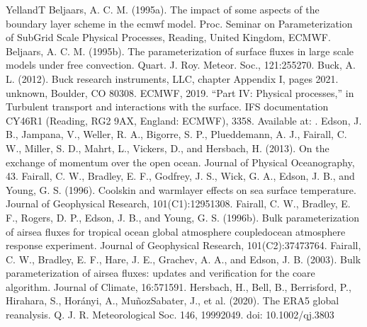 \documentclass[letterpaper,10pt,english]{sphinxmanual}
\begin{document}
\begin{sphinxthebibliography}{YellandT}
\sphinxAtStartPar
Beljaars, A. C. M. (1995a). The impact of some aspects of the boundary layer scheme in the ecmwf model. Proc. Seminar on Parameterization of Sub\sphinxhyphen{}Grid Scale Physical Processes, Reading, United Kingdom, ECMWF.
\sphinxAtStartPar
Beljaars, A. C. M. (1995b). The parameterization of surface fluxes in large scale models under free convection. Quart. J. Roy. Meteor. Soc., 121:255\textendash{}270.
\sphinxAtStartPar
Buck, A. L. (2012). Buck research instruments, LLC, chapter Appendix I, pages 20\textendash{}21. unknown, Boulder, CO 80308.
\sphinxAtStartPar
ECMWF, 2019. “Part IV: Physical processes,” in Turbulent transport and interactions with the surface. IFS documentation CY46R1 (Reading, RG2 9AX, England: ECMWF), 33\textendash{}58. Available at: .
\sphinxAtStartPar
Edson, J. B., Jampana, V., Weller, R. A., Bigorre, S. P., Plueddemann, A. J., Fairall, C. W., Miller, S. D., Mahrt, L., Vickers, D., and Hersbach, H. (2013). On the exchange of momentum over the open ocean. Journal of Physical Oceanography, 43.
\sphinxAtStartPar
Fairall, C. W., Bradley, E. F., Godfrey, J. S., Wick, G. A., Edson, J. B., and Young, G. S. (1996). Cool\sphinxhyphen{}skin and warm\sphinxhyphen{}layer effects on sea surface temperature. Journal of Geophysical Research, 101(C1):1295\textendash{}1308.
\sphinxAtStartPar
Fairall, C. W., Bradley, E. F., Rogers, D. P., Edson, J. B., and Young, G. S. (1996b). Bulk parameterization of air\sphinxhyphen{}sea fluxes for tropical ocean global atmosphere coupled\sphinxhyphen{}ocean atmosphere response experiment. Journal of Geophysical Research, 101(C2):3747\textendash{}3764.
\sphinxAtStartPar
Fairall, C. W., Bradley, E. F., Hare, J. E., Grachev, A. A., and Edson, J. B. (2003). Bulk parameterization of air\sphinxhyphen{}sea fluxes: updates and verification for the coare algorithm. Journal of Climate, 16:571\textendash{}591.
\sphinxAtStartPar
Hersbach, H., Bell, B., Berrisford, P., Hirahara, S., Horányi, A., Muñoz\sphinxhyphen{}Sabater, J., et al. (2020). The ERA5 global reanalysis. Q. J. R. Meteorological Soc. 146, 1999\textendash{}2049. doi: 10.1002/qj.3803

\end{sphinxthebibliography}
\end{document}
